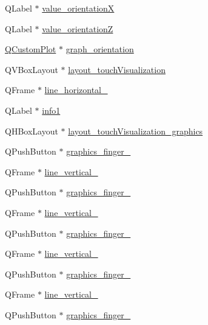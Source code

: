 \begin{DoxyCompactItemize}
\item 
Q\+Label $\ast$ \hyperlink{class_ui___main_window_a47d0ca2b8120b3b1b0bacb898960cf0c}{value\+\_\+orientationX}
\item 
Q\+Label $\ast$ \hyperlink{class_ui___main_window_a3c384c66c75b77b8d0e1f517f2b52f29}{value\+\_\+orientationZ}
\item 
\hyperlink{class_q_custom_plot}{Q\+Custom\+Plot} $\ast$ \hyperlink{class_ui___main_window_a0693088beb7812b075fe86bfd62f0301}{graph\+\_\+orientation}
\item 
Q\+V\+Box\+Layout $\ast$ \hyperlink{class_ui___main_window_aa983922ea4eefea8bd4855484f79b928}{layout\+\_\+touch\+Visualization}
\item 
Q\+Frame $\ast$ \hyperlink{class_ui___main_window_a7d5db377ffb3f6facf76d134fba8f4d5}{line\+\_\+horizontal\+\_}
\item 
Q\+Label $\ast$ \hyperlink{class_ui___main_window_a5f8ce01433f262c298949fa023b4ac4a}{info1}
\item 
Q\+H\+Box\+Layout $\ast$ \hyperlink{class_ui___main_window_a98bbbada6f684a1f9e1e3c5e5738e464}{layout\+\_\+touch\+Visualization\+\_\+graphics}
\item 
Q\+Push\+Button $\ast$ \hyperlink{class_ui___main_window_a39449669736ad697f196ada81b273126}{graphics\+\_\+finger\+\_}
\item 
Q\+Frame $\ast$ \hyperlink{class_ui___main_window_acbd2cca937a75eb9ba337208587d5015}{line\+\_\+vertical\+\_}
\item 
Q\+Push\+Button $\ast$ \hyperlink{class_ui___main_window_a7d77f22564bdc19875c4a8d27bba2d9f}{graphics\+\_\+finger\+\_}
\item 
Q\+Frame $\ast$ \hyperlink{class_ui___main_window_a2bc1cadfbaa1513e465e447e0e47da2c}{line\+\_\+vertical\+\_}
\item 
Q\+Push\+Button $\ast$ \hyperlink{class_ui___main_window_aad4d3b4db8df0916febedf7f6bf2022c}{graphics\+\_\+finger\+\_}
\item 
Q\+Frame $\ast$ \hyperlink{class_ui___main_window_a7324a0382f752916a0f0de5f90c54931}{line\+\_\+vertical\+\_}
\item 
Q\+Push\+Button $\ast$ \hyperlink{class_ui___main_window_a5aabc30af00da6b81887c5077137e59a}{graphics\+\_\+finger\+\_}
\item 
Q\+Frame $\ast$ \hyperlink{class_ui___main_window_ae7241f8c64908b8a4dbc18f2daa45877}{line\+\_\+vertical\+\_}
\item 
Q\+Push\+Button $\ast$ \hyperlink{class_ui___main_window_a569d63d1e74a10fde456435fe287444a}{graphics\+\_\+finger\+\_}

\end{DoxyCompactItemize}
